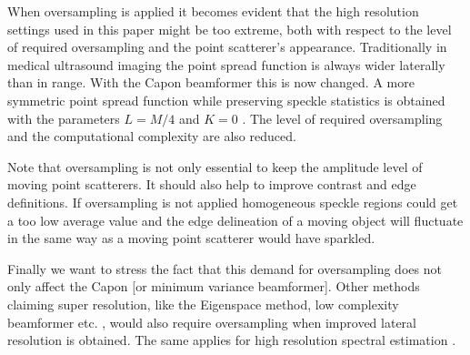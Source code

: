 \documentclass[draftcls]{IEEEtran}
\begin{document}
When oversampling is applied it becomes evident that the high resolution settings used in this paper might be too extreme, both with respect to the level of required oversampling and the point scatterer's appearance. Traditionally in medical ultrasound imaging the point spread function is always wider laterally than in range. With the Capon beamformer this is now changed. A more symmetric point spread function while preserving speckle statistics is obtained with the parameters $L=M/4$ and $K=0$ \cite{Synnevag2007a}. The level of required oversampling and the computational complexity are also reduced. %

Note that oversampling is not only essential to keep the amplitude level of moving point scatterers. It should also help to improve contrast and edge definitions. If oversampling is not applied homogeneous speckle regions could get a too low average value and the edge delineation of a moving object will fluctuate in the same way as a moving point scatterer would have sparkled.

Finally we want to stress the fact that this demand for oversampling does not only affect the Capon [or minimum variance beamformer]. Other methods claiming super resolution, like the Eigenspace method, low complexity beamformer etc. \cite{Synnevag2011, Nilsen2009, Mehdizadeh2012a, Kim}, would also require oversampling when improved lateral resolution is obtained. The same applies for high resolution spectral estimation \cite{Ekroll2012}.


\end{document}
